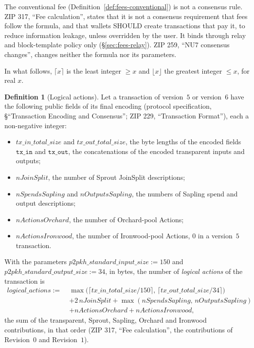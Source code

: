 \documentclass[11pt,a4paper]{article}
\theoremstyle{definition}
\newtheorem{definition}[theorem]{Definition}
\begin{document}
The conventional fee (Definition~\ref{def:fees-conventional}) is not a
consensus rule. ZIP 317, ``Fee calculation'', states that it is not a
consensus requirement that fees follow the formula, and that wallets SHOULD
create transactions that pay it, to reduce information leakage, unless
overridden by the user. It binds through relay and block-template policy
only (\S\ref{sec:fees-relay}). ZIP 259, ``NU7 consensus changes'', changes
neither the formula nor its parameters.

In what follows, $\lceil x \rceil$ is the least integer $\ge x$ and
$\lfloor x \rfloor$ the greatest integer $\le x$, for real $x$.

\begin{definition}[Logical actions]\label{def:fees-logical}
Let a transaction of version~$5$ or version~$6$ have the following public
fields of its final encoding (protocol specification, \S``Transaction
Encoding and Consensus''; ZIP 229, ``Transaction Format''), each a
non-negative integer:
\begin{itemize}
\item $\mathit{tx\_in\_total\_size}$ and $\mathit{tx\_out\_total\_size}$,
  the byte lengths of the encoded fields $\mathtt{tx\_in}$ and
  $\mathtt{tx\_out}$, the concatenations of the encoded transparent inputs
  and outputs;
\item $\mathit{nJoinSplit}$, the number of Sprout JoinSplit descriptions;
\item $\mathit{nSpendsSapling}$ and $\mathit{nOutputsSapling}$, the numbers
  of Sapling spend and output descriptions;
\item $\mathit{nActionsOrchard}$, the number of Orchard-pool Actions;
\item $\mathit{nActionsIronwood}$, the number of Ironwood-pool Actions,
  $0$ in a version~$5$ transaction.
\end{itemize}
With the parameters $\mathit{p2pkh\_standard\_input\_size} := 150$ and
$\mathit{p2pkh\_standard\_output\_size} := 34$, in bytes, the number of
\emph{logical actions} of the transaction is
\begin{align*}
  \mathit{logical\_actions} :=\;
  &\max\bigl(\lceil \mathit{tx\_in\_total\_size} / 150 \rceil,\,
    \lceil \mathit{tx\_out\_total\_size} / 34 \rceil\bigr) \\
  &+ 2\,\mathit{nJoinSplit}
    + \max(\mathit{nSpendsSapling},\, \mathit{nOutputsSapling}) \\
  &+ \mathit{nActionsOrchard} + \mathit{nActionsIronwood},
\end{align*}
the sum of the transparent, Sprout, Sapling, Orchard and Ironwood
contributions, in that order (ZIP 317, ``Fee calculation'', the
contributions of Revision~$0$ and Revision~$1$).
\end{definition}
\end{document}
